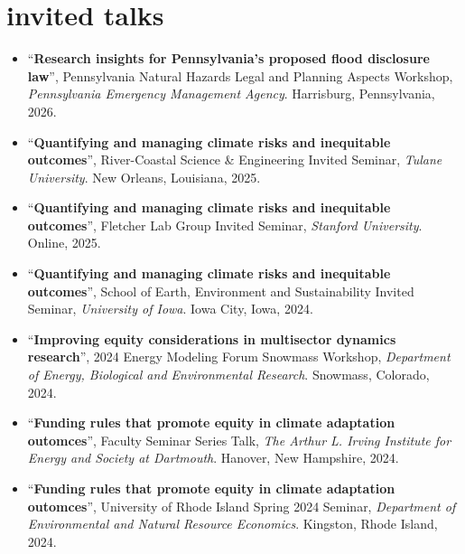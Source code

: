 \documentclass[10pt,oneside]{article}
\begin{document}
\mbox{}\vspace{-\dimexpr\baselineskip\relax}
\vspace*{-1em}
\printbibliography[type=misc, heading=none]


\section{invited talks}

\mbox{}\vspace{-\dimexpr\baselineskip\relax}

\begin{itemize}[label={}]
  
  \item \enquote{\textbf{Research insights for Pennsylvania’s proposed flood disclosure law}}, Pennsylvania Natural Hazards Legal and Planning Aspects Workshop,  \textit{Pennsylvania Emergency Management Agency}. Harrisburg, Pennsylvania, 2026.
  
  \item \enquote{\textbf{Quantifying and managing climate risks and inequitable outcomes}}, River-Coastal Science \& Engineering Invited Seminar,  \textit{Tulane University}. New Orleans, Louisiana, 2025.
  
  \item \enquote{\textbf{Quantifying and managing climate risks and inequitable outcomes}}, Fletcher Lab Group Invited Seminar,  \textit{Stanford University}. Online, 2025.
  
  \item \enquote{\textbf{Quantifying and managing climate risks and inequitable outcomes}}, School of Earth, Environment and Sustainability Invited Seminar,  \textit{University of Iowa}. Iowa City, Iowa, 2024.
  
  \item \enquote{\textbf{Improving equity considerations in multisector dynamics research}}, 2024 Energy Modeling Forum Snowmass Workshop,  \textit{Department of Energy, Biological and Environmental Research}. Snowmass, Colorado, 2024.
  
  \item \enquote{\textbf{Funding rules that promote equity in climate adaptation outomces}}, Faculty Seminar Series Talk,  \textit{The Arthur L. Irving Institute for Energy and Society at Dartmouth}. Hanover, New Hampshire, 2024.
  
  \item \enquote{\textbf{Funding rules that promote equity in climate adaptation outomces}}, University of Rhode Island Spring 2024 Seminar,  \textit{Department of Environmental and Natural Resource Economics}. Kingston, Rhode Island, 2024.
  

\end{itemize}
\end{document}

